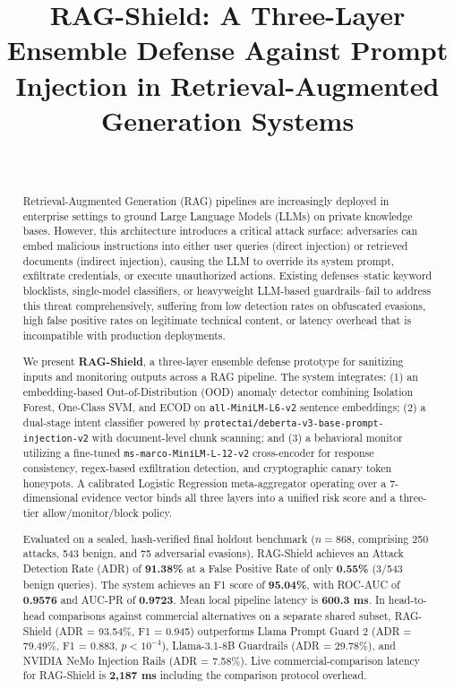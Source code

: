 \documentclass[conference]{IEEEtran}
\title{RAG-Shield: A Three-Layer Ensemble Defense Against Prompt Injection in Retrieval-Augmented Generation Systems}
\author{\IEEEauthorblockN{Author Names Placeholder}\\
\IEEEauthorblockA{Institution Placeholder\\Email Placeholder}}
\begin{document}
\maketitle

\begin{abstract}
Retrieval-Augmented Generation (RAG) pipelines are increasingly deployed in enterprise settings to ground Large Language Models (LLMs) on private knowledge bases. However, this architecture introduces a critical attack surface: adversaries can embed malicious instructions into either user queries (direct injection) or retrieved documents (indirect injection), causing the LLM to override its system prompt, exfiltrate credentials, or execute unauthorized actions. Existing defenses--static keyword blocklists, single-model classifiers, or heavyweight LLM-based guardrails--fail to address this threat comprehensively, suffering from low detection rates on obfuscated evasions, high false positive rates on legitimate technical content, or latency overhead that is incompatible with production deployments.

We present \textbf{RAG-Shield}, a three-layer ensemble defense prototype for sanitizing inputs and monitoring outputs across a RAG pipeline. The system integrates: (1) an embedding-based Out-of-Distribution (OOD) anomaly detector combining Isolation Forest, One-Class SVM, and ECOD on \texttt{all-MiniLM-L6-v2} sentence embeddings; (2) a dual-stage intent classifier powered by \texttt{protectai/deberta-v3-base-prompt-injection-v2} with document-level chunk scanning; and (3) a behavioral monitor utilizing a fine-tuned \texttt{ms-marco-MiniLM-L-12-v2} cross-encoder for response consistency, regex-based exfiltration detection, and cryptographic canary token honeypots. A calibrated Logistic Regression meta-aggregator operating over a 7-dimensional evidence vector binds all three layers into a unified risk score and a three-tier allow/monitor/block policy.

Evaluated on a sealed, hash-verified final holdout benchmark ($n = 868$, comprising 250 attacks, 543 benign, and 75 adversarial evasions), RAG-Shield achieves an Attack Detection Rate (ADR) of \textbf{91.38\%} at a False Positive Rate of only \textbf{0.55\%} (3/543 benign queries). The system achieves an F1 score of \textbf{95.04\%}, with ROC-AUC of \textbf{0.9576} and AUC-PR of \textbf{0.9723}. Mean local pipeline latency is \textbf{600.3 ms}. In head-to-head comparisons against commercial alternatives on a separate shared subset, RAG-Shield (ADR = 93.54\%, F1 = 0.945) outperforms Llama Prompt Guard 2 (ADR = 79.49\%, F1 = 0.883, $p < 10^{-4}$), Llama-3.1-8B Guardrails (ADR = 29.78\%), and NVIDIA NeMo Injection Rails (ADR = 7.58\%). Live commercial-comparison latency for RAG-Shield is \textbf{2,187 ms} including the comparison protocol overhead.
\end{abstract}
\end{document}
